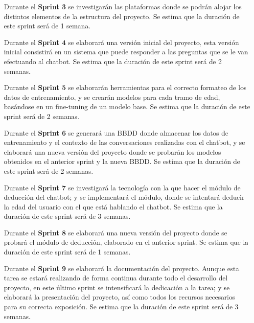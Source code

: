 Durante el \textbf{Sprint 3} se investigarán las plataformas donde se podrán alojar los distintos elementos de la estructura del proyecto. Se estima que la duración de este sprint será de 1 semana.

Durante el \textbf{Sprint 4} se elaborará una versión inicial del proyecto, esta versión inicial consistirá en un sistema que puede responder a las preguntas que se le van efectuando al chatbot. Se estima que la duración de este sprint será de 2 semanas.

Durante el \textbf{Sprint 5} se elaborarán herramientas para el correcto formateo de los datos de entrenamiento, y se crearán modelos para cada tramo de edad, basándose en un fine-tuning de un modelo base. Se estima que la duración de este sprint será de 2 semanas.

Durante el \textbf{Sprint 6} se generará una BBDD donde almacenar los datos de entrenamiento y el contexto de las conversaciones realizadas con el chatbot, y se elaborará una nueva versión del proyecto donde se probarán los modelos obtenidos en el anterior sprint y la nueva BBDD. Se estima que la duración de este sprint será de 2 semanas.

Durante el \textbf{Sprint 7} se investigará la tecnología con la que hacer el módulo de deducción del chatbot; y se implementará el módulo, donde se intentará deducir la edad del usuario con el que está hablando el chatbot. Se estima que la duración de este sprint será de 3 semanas.

Durante el \textbf{Sprint 8} se elaborará una nueva versión del proyecto donde se probará el módulo de deducción, elaborado en el anterior sprint. Se estima que la duración de este sprint será de 1 semanas.

Durante el \textbf{Sprint 9} se elaborará la documentación del proyecto. Aunque esta tarea se estará realizando de forma continua durante todo el desarrollo del proyecto, en este último sprint se intensificará la dedicación a la tarea; y se elaborará la presentación del proyecto, así como todos los recursos necesarios para su correcta exposición. Se estima que la duración de este sprint será de 3 semanas.



